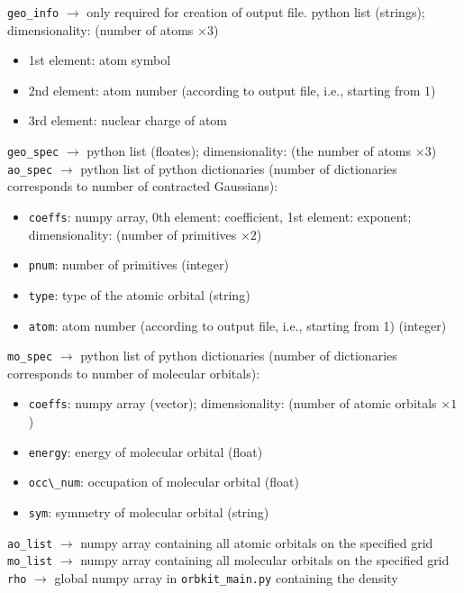 \documentclass[a4paper,10pt]{scrartcl}
\begin{document}
\verb!geo_info! $\rightarrow$ only required for creation of output file. python list
(strings); dimensionality: (number of atoms $\times 3$)
\begin{itemize}
\item 1st element: atom symbol
\item 2nd element: atom number (according to output file, i.e., starting
from 1)
\item 3rd element: nuclear charge of atom
\end{itemize}
\verb!geo_spec! $\rightarrow$ python list (floates); dimensionality: (the number of atoms $\times 3$)\\
\verb!ao_spec! $\rightarrow$ python list of python dictionaries (number of dictionaries
corresponds to number of contracted Gaussians):
\begin{itemize}
\item \verb!coeffs!: numpy array, 0th element: coefficient, 1st element: exponent;
dimensionality: (number of primitives $\times 2$)
\item \verb!pnum!: number of primitives (integer)
\item \verb!type!: type of the atomic orbital (string)
\item \verb!atom!: atom number (according to output file, i.e., starting from 1) (integer)
\end{itemize}
\verb!mo_spec! $\rightarrow$ python list of python dictionaries (number of dictionaries
corresponds to number of molecular orbitals):
\begin{itemize}
\item \verb!coeffs!: numpy array (vector); dimensionality: (number of atomic
orbitals $\times 1$)
\item \verb!energy!: energy of molecular orbital (float)
\item \verb!occ\_num!: occupation of molecular orbital (float)
\item \verb!sym!: symmetry of molecular orbital (string)
\end{itemize}
\verb!ao_list! $\rightarrow$ numpy array containing all atomic orbitals on the specified
grid\\
\verb!mo_list! $\rightarrow$ numpy array containing all molecular orbitals on the specified
grid\\
\verb!rho! $\rightarrow$ global numpy array in \verb!orbkit_main.py! containing the density
\end{document}
